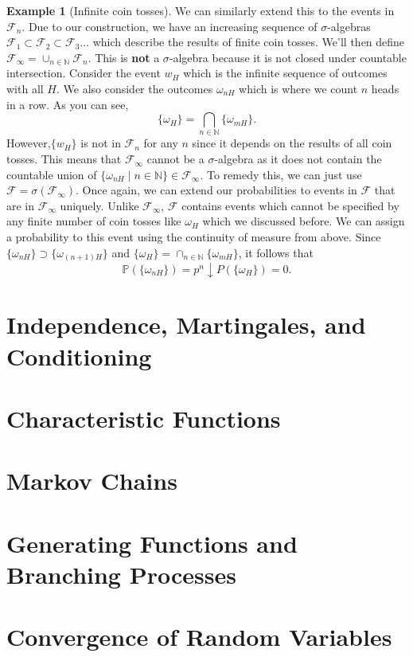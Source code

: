 \documentclass[12pt]{article}
\newcommand{\bbN}{\mathbb{N}}
\newcommand{\calF}{\mathcal{F}}
\newcommand{\Prob}{\mathbb{P}}
\theoremstyle{definition}
\newtheorem{exmp}[thm]{Example}
\theoremstyle{remark}
\numberwithin{equation}{section}
\begin{document}
\begin{exmp}[Infinite coin tosses]
We can similarly extend this to the events in $\calF_n$. Due to our construction, we have an increasing sequence of $\sigma$-algebras $\calF_1 \subset \calF_2 \subset \calF_3 \ldots$ which describe the results of finite coin tosses. We'll then define $\calF_\infty = \cup_{n\in\bbN} \calF_n$. This is \textbf{not} a $\sigma$-algebra because it is not closed under countable intersection. Consider the event $w_H$ which is the infinite sequence of outcomes with all $H$. We also consider the outcomes $\omega_{nH}$ which is where we count $n$ heads in a row. As you can see,
\begin{equation}  
  \{\omega_H \} = \bigcap_{n\in\bbN} \{\omega_{mH}\}.
\end{equation}
However,$ \{ w_H\}$ is not in $\calF_n$ for any $n$ since it depends on the results of all coin tosses. This means that $\calF_\infty$ cannot be a $\sigma$-algebra as it does not contain the countable union of $\{ \omega_{nH}\mid n\in\bbN\} \in \calF_\infty$. To remedy this, we can just use $\calF = \sigma(\calF_\infty)$. Once again, we can extend our probabilities to events in $\calF$ that are in $\calF_\infty$ uniquely. Unlike $\calF_\infty$, $\calF$ contains events which cannot be specified by any finite number of coin tosses like $\omega_H$ which we discussed before. We can assign a probability to this event using the continuity of measure from above. Since $\{\omega_{nH}\} \supset \{\omega_{(n+1)H}\}$ and $\{\omega_H \} = \cap_{n\in\bbN} \{\omega_{mH}\}$, it follows that 
\begin{equation}
  \Prob(\{\omega_{nH} \}) = p^n \downarrow P(\{\omega_H\}) = 0.
\end{equation}
\end{exmp}

\section{Independence, Martingales, and Conditioning}%
  \label{sec:independence_martingales_and_conditioning}
 
  \section{Characteristic Functions}%
  \label{sec:characteristic_functions}
  
  \section{Markov Chains}%
  \label{sec:markov_chains}
  
  \section{Generating Functions and Branching Processes}%
  \label{sec:generating_functions_and_branching_processes}
  
  \section{Convergence of Random Variables}%
  \label{sec:convergence_of_random_variables} 
\end{document}
